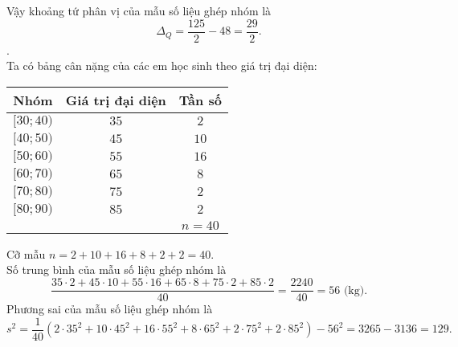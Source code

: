 \begin{ex}
{\begin{itemchoice}
\[\]
Vậy khoảng tứ phân vị của mẫu số liệu ghép nhóm là 
\[
\Delta_Q=\dfrac{125}{2}-48=\dfrac{29}{2}.
\]
. \\ Ta có bảng cân nặng của các em học sinh theo giá trị đại diện:
\begin{center}
\begin{tabular}{|c|c|c|}
\hline
Nhóm & Giá trị đại diện & Tần số\\
\hline $[30 ;40)$ & $35$ & $2$\\
\hline $[40 ;50)$ & $45$ & $10$\\
\hline $[50 ;60)$ & $55$ & $16$\\
\hline $[60 ;70)$ & $65$ & $8$\\
\hline $[70 ;80)$ & $75$ & $2$\\
\hline $[80 ;90)$ & $85$ & $2$\\
\hline & & $n=40$\\
\hline
\end{tabular}
\end{center}
Cỡ mẫu $n=2+10+16+8+2+2=40 $.\\
Số trung bình của mẫu số liệu ghép nhóm là 
\[
\dfrac{35\cdot 2+45\cdot 10+55\cdot 16+65\cdot 8+75\cdot 2+85\cdot 2}{40}=\dfrac{2240}{40}=56 \text{ (kg).}
\]
Phương sai của mẫu số liệu ghép nhóm là 
\[
s^2=\dfrac{1}{40}\left(2\cdot 35^2+10\cdot 45^2+16\cdot 55^2+8\cdot 65^2+2\cdot 75^2+2\cdot 85^2\right)-56^2=3265-3136=129.
\]
\end{itemchoice}
}
\end{ex}

